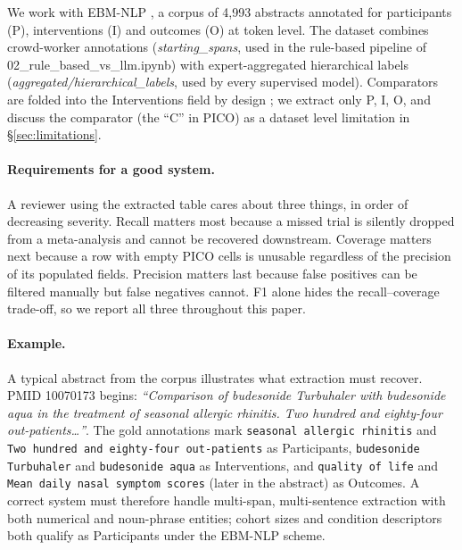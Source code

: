 \documentclass[11pt]{article}
\begin{document}
We work with EBM-NLP \citep{nye2018ebmnlp}, a corpus of 4{,}993 abstracts
annotated for participants (P), interventions (I) and outcomes (O) at token
level. The dataset combines crowd-worker annotations
(\textit{starting\_spans}, used in the rule-based pipeline of 02\_rule\_based\_vs\_llm.ipynb) with expert-aggregated hierarchical labels
(\textit{aggregated/hierarchical\_labels}, used by every supervised model).
Comparators are folded into the Interventions field by design
\citep[\S2]{nye2018ebmnlp}; we extract only P, I, O, and discuss the
comparator (the ``C'' in PICO) as a dataset level limitation in
\S\ref{sec:limitations}.

\paragraph{Requirements for a good system.} A reviewer using the extracted
table cares about three things, in order of decreasing severity. Recall
matters most because a missed trial is silently dropped from a meta-analysis
and cannot be recovered downstream. Coverage matters next because a row
with empty PICO cells is unusable regardless of the precision of its
populated fields. Precision matters last because false positives can be
filtered manually but false negatives cannot. F1 alone hides the
recall--coverage trade-off, so we report all three throughout this paper.

\paragraph{Example.} A typical abstract from the corpus illustrates what
extraction must recover. PMID 10070173 begins: \textit{``Comparison of
budesonide Turbuhaler with budesonide aqua in the treatment of seasonal
allergic rhinitis. Two hundred and eighty-four out-patients\dots''}. The
gold annotations mark \texttt{seasonal allergic rhinitis} and
\texttt{Two hundred and eighty-four out-patients} as Participants,
\texttt{budesonide Turbuhaler} and \texttt{budesonide aqua} as
Interventions, and \texttt{quality of life} and \texttt{Mean daily nasal
symptom scores} (later in the abstract) as Outcomes. A correct system
must therefore handle multi-span, multi-sentence extraction with both
numerical and noun-phrase entities; cohort sizes and condition
descriptors both qualify as Participants under the EBM-NLP scheme.
\end{document}
